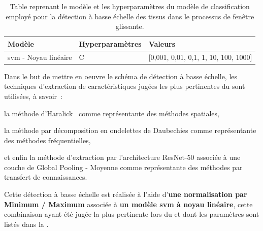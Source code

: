 \begin{table}[H]
    \centering
    \begin{tabular}{lll}
        \toprule
        \textbf{Modèle}                                 & \textbf{Hyperparamètres}  & \textbf{Valeurs}                          \\ \midrule
        \gls{svm} - Noyau linéaire                      & C                         & [0,001, 0,01, 0,1, 1, 10, 100, 1000]      \\ 
        \bottomrule 
    \end{tabular} 
    \caption{Table reprenant le modèle et les hyperparamètres du modèle de classification employé pour la détection à basse échelle des tissus dans le processus de fenêtre glissante.}
    \label{tab:parameters_image_improvement_sliding_window_models}
\end{table}\par

Dans le but de mettre en oeuvre le schéma de détection à basse échelle, les techniques d'extraction de caractéristiques jugées les plus pertinentes du  sont utilisées, à savoir~:~
\begin{inlinerate}
    \item la méthode d'Haralick~ comme représentante des méthodes spatiales,
    \item la méthode par décomposition en ondelettes de Daubechies comme représentante des méthodes fréquentielles,
    \item et enfin la méthode d'extraction par l'architecture ResNet-50 associée à une couche de Global Pooling - Moyenne comme représentante des méthodes par transfert de connaissances.
\end{inlinerate} Cette détection à basse échelle est réalisée à l'aide d'\textbf{une normalisation par Minimum / Maximum} associée à \textbf{un modèle \gls{svm} à noyau linéaire}, cette combinaison ayant été jugée la plus pertinente lors du  et dont les paramètres sont listés dans la .\par

